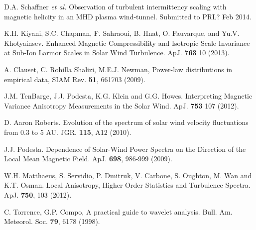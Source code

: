 \documentclass[aip,prl,amsmath,amssymb,reprint,superscriptaddress]{revtex4-1} %
\begin{document}
\begin{thebibliography}{99}
 D.A. Schaffner {\it et al.} Observation of turbulent intermittency scaling with magnetic helicity in an MHD plasma wind-tunnel. Submitted to PRL? Feb 2014.

 K.H. Kiyani, S.C. Chapman, F. Sahraoui, B. Hnat, O. Fauvarque, and Yu.V. Khotyainsev. Enhanced Magnetic Compressibility and Isotropic Scale Invariance at Sub-Ion Larmor Scales in Solar Wind Turbulence. ApJ. {\bf 763} 10 (2013).

A. Clauset, C. Rohilla Shalizi, M.E.J. Newman, Power-law distributions in empirical data, SIAM Rev. {\bf 51}, 661703 (2009).

 J.M. TenBarge, J.J. Podesta, K.G. Klein and G.G. Howes. Interpreting Magnetic Variance Anisotropy Measurements in the Solar Wind. ApJ. {\bf 753} 107 (2012).

D. Aaron Roberts. Evolution of the spectrum of solar wind velocity fluctuations from 0.3 to 5 AU. JGR. {\bf 115}, A12 (2010).

J.J. Podesta. Dependence of Solar-Wind Power Spectra on the Direction of the Local Mean Magnetic Field. ApJ. {\bf 698}, 986-999 (2009).

W.H. Matthaeus, S. Servidio, P. Dmitruk, V. Carbone, S. Oughton, M. Wan and K.T. Osman. Local Anisotropy, Higher Order Statistics and Turbulence Spectra. ApJ. {\bf 750}, 103 (2012).

C. Torrence, G.P. Compo, A practical guide to wavelet analysis. Bull. Am. Meteorol. Soc. {\bf 79}, 6178 (1998).







\end{thebibliography}
\end{document}
